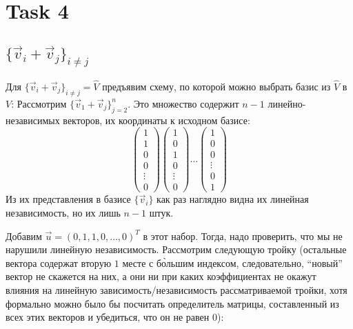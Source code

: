 \section{Task 4}
\subsection{$\{\vec{v}_i + \vec{v}_j\}_{i \neq j}$}
Для $\{\vec{v}_i + \vec{v}_j\}_{i \neq j} = \hat{V}$ предъявим схему, по которой можно выбрать базис из $\hat{V}$ в $V$:
Рассмотрим $\{\vec{v}_1 + \vec{v}_j\}_{j = 2}^n$.
Это множество содержит $n - 1$ линейно-независимых векторов, их координаты к исходном базисе:
\begin{equation}
    \begin{pmatrix}
        1 \\
        1 \\
        0 \\
        0 \\
        \vdots \\
        0
    \end{pmatrix}
    \begin{pmatrix}
        1 \\
        0 \\
        1 \\
        0 \\
        \vdots \\
        0
    \end{pmatrix} \ldots
    \begin{pmatrix}
        1 \\
        0 \\
        0 \\
        \vdots \\
        0 \\
        1
    \end{pmatrix}
\end{equation}
Из их представления в базисе $\{\vec{v}_i\}$ как раз наглядно видна их линейная независимость, но их лишь $n - 1$ штук.

Добавим $\vec{u} = (0, 1, 1, 0, \ldots, 0)^T$ в этот набор. Тогда, надо проверить, что мы не нарушили линейную независимость.
Рассмотрим следующую тройку (остальные вектора содержат вторую $1$ месте с б\`ольшим индексом, следовательно, ``новый'' вектор не скажется на них, а они ни при каких коэффициентах не окажут влияния на линейную зависимость/независимость рассматриваемой тройки, хотя формально можно было бы посчитать определитель матрицы, составленный из всех этих векторов и убедиться, что он не равен $0$):

